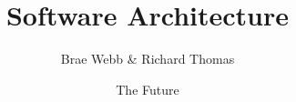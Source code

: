 \documentclass{csse4400}
\title{Software Architecture}
\author{Brae Webb \& Richard Thomas}
\date{{\color{red} The Future}}
\begin{document}
\makecover





\end{document}
